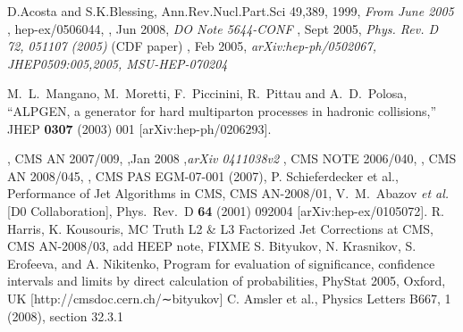 


%

\begin{thebibliography}{9}
   {D.Acosta and S.K.Blessing, Ann.Rev.Nucl.Part.Sci 49,389},
    1999,
    {\em From June 2005}
  , hep-ex/0506044,
  , Jun 2008,
  {\em DO Note 5644-CONF}
  , Sept 2005,
  {\em Phys. Rev. D 72, 051107 (2005)} (CDF paper)
  , Feb 2005,
  {\em arXiv:hep-ph/0502067, JHEP0509:005,2005, MSU-HEP-070204}
  

    M.~L.~Mangano, M.~Moretti, F.~Piccinini, R.~Pittau and A.~D.~Polosa,
    ``ALPGEN, a generator for hard multiparton processes in hadronic collisions,''
    JHEP {\bf 0307} (2003) 001
    [arXiv:hep-ph/0206293].

  , CMS AN 2007/009,
  ,Jan 2008 ,{\em arXiv 0411038v2}
  , CMS NOTE 2006/040,
  , CMS AN 2008/045,
  , CMS PAS EGM-07-001 (2007),
   {P. Schieferdecker et al., Performance of Jet Algorithms in CMS}, CMS AN-2008/01,
    V.~M.~Abazov {\it et al.}  [D0 Collaboration], 	 
    Phys.\ Rev.\  D {\bf 64} (2001) 092004 	 
    [arXiv:hep-ex/0105072]. 	 
   {R. Harris, K. Kousouris, MC Truth L2 \& L3 Factorized Jet Corrections at CMS}, CMS AN-2008/03,
   {add HEEP note}, FIXME
   S. Bityukov, N. Krasnikov, S. Erofeeva, and A. Nikitenko, Program for evaluation of significance,
                    confidence intervals and limits by direct calculation of probabilities, PhyStat 2005, Oxford, UK 
                    [http://cmsdoc.cern.ch/∼bityukov]
    C. Amsler et al., Physics Letters B667, 1 (2008), section 32.3.1

 
 
 \end{thebibliography}
 

%

